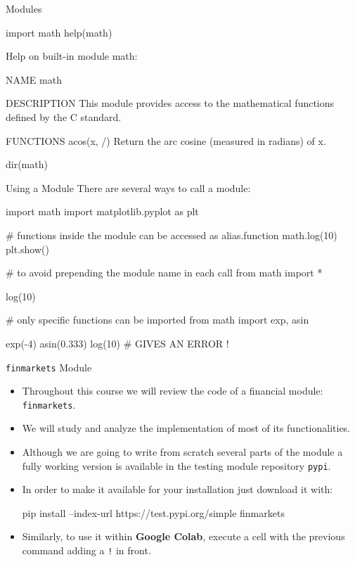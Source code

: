 \documentclass{beamer}
\begin{document}
\begin{frame}[fragile]{Modules}
\begin{ipython}
import math
help(math)
\end{ipython}
\begin{ioutput}
Help on built-in module math:

NAME
    math

DESCRIPTION
    This module provides access to the mathematical functions
    defined by the C standard.

FUNCTIONS
    acos(x, /)
        Return the arc cosine (measured in radians) of x.
\end{ioutput}
\begin{ipython}
dir(math)
\end{ipython}
\begin{ioutput}
['__doc__', '__loader__', '__name__', '__package__', '__spec__', 'acos',
 'acosh', 'asin', 'asinh', 'atan', 'atan2', 'atanh', ...
\end{ioutput}    
\end{frame}

\begin{frame}[fragile]{Using a Module}
  There are several ways to call a module:
  \begin{ipython}
import math
import matplotlib.pyplot as plt

# functions inside the module can be accessed as alias.function
math.log(10)
plt.show()

# to avoid prepending the module name in each call
from math import *

log(10)

# only specific functions can be imported
from math import exp, asin

exp(-4)
asin(0.333)
log(10) # GIVES AN ERROR !
\end{ipython}
\end{frame}

\begin{frame}[fragile]{\texttt{finmarkets} Module}
  \begin{itemize}
  \item Throughout this course we will review the code of a financial module: \texttt{finmarkets}.
  \item We will study and analyze the implementation of most of its functionalities.
  \item Although we are going to write from scratch several parts of the module a fully working version is available in the testing module repository \texttt{pypi}.
  \item In order to make it available for your installation just download it with:
\begin{ipython}
pip install --index-url https://test.pypi.org/simple finmarkets
\end{ipython}
  \item Similarly, to use it within \textbf{Google Colab}, execute a cell with the previous command adding a \texttt{!} in front.
  \end{itemize}
\end{frame}
\end{document}
